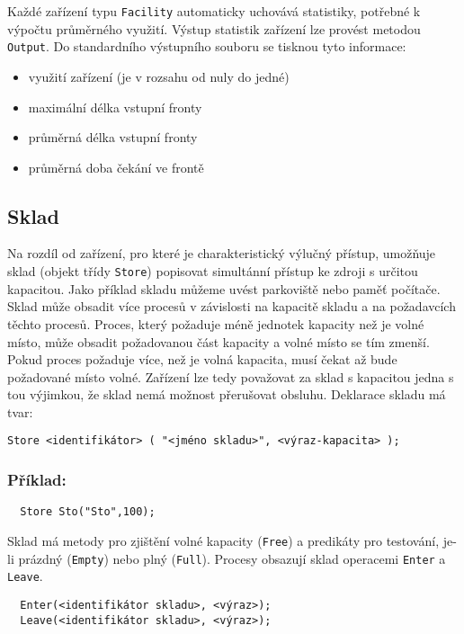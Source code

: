 \documentclass[a4paper]{article}
\begin{document}
Každé zařízení typu \verb|Facility| automaticky uchovává statistiky, potřebné
k výpočtu průměrného využití. Výstup statistik zařízení lze provést metodou
\verb|Output|. Do standardního výstupního souboru se tisknou tyto informace:

\begin{itemize}
\item využití zařízení (je v rozsahu od nuly do jedné)
\item maximální délka vstupní fronty
\item průměrná délka vstupní fronty
\item průměrná doba čekání ve frontě
\end{itemize}

\subsection{Sklad}

Na rozdíl od zařízení, pro které je charakteristický výlučný přístup,
umožňuje sklad (objekt třídy \verb|Store|) popisovat simultánní přístup ke
zdroji s určitou kapacitou. Jako příklad skladu můžeme uvést parkoviště nebo
paměť počítače. Sklad může obsadit více procesů v závislosti na kapacitě
skladu a na požadavcích těchto procesů. Proces, který požaduje méně jednotek
kapacity než je volné místo, může obsadit požadovanou část kapacity a volné
místo se tím zmenší. Pokud proces požaduje více, než je volná kapacita, musí
čekat až bude požadované místo volné. Zařízení lze tedy považovat za sklad s
kapacitou jedna s tou výjimkou, že sklad nemá možnost přerušovat obsluhu.
Deklarace skladu má tvar:

\begin{verbatim}
Store <identifikátor> ( "<jméno skladu>", <výraz-kapacita> );
\end{verbatim}


\subsubsection*{Příklad:}

\begin{verbatim}
  Store Sto("Sto",100);
\end{verbatim}

Sklad má metody pro zjištění volné kapacity (\verb|Free|) a predikáty pro
testování, je-li prázdný (\verb|Empty|) nebo plný (\verb|Full|). Procesy
obsazují sklad operacemi \verb|Enter| a \verb|Leave|.

\begin{verbatim}
  Enter(<identifikátor skladu>, <výraz>);
  Leave(<identifikátor skladu>, <výraz>);
\end{verbatim}
\end{document}
